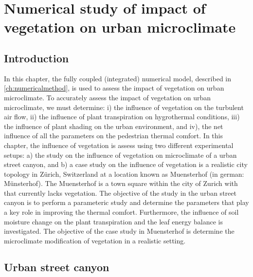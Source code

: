 \chapter{Numerical study of impact of vegetation on urban microclimate}
\label{ch:impactofvegetation}
\def\figdir{chapters/ch08_numericalstudy/figures}	
%		

\section{Introduction}

In this chapter, the fully coupled (integrated) numerical model, described in \cref{ch:numericalmethod}, is used to assess the impact of vegetation on urban microclimate. To accurately assess the impact of vegetation on urban microclimate, we must determine: i) the influence of vegetation on the turbulent air flow, ii) the influence of plant transpiration on hygrothermal conditions, iii) the influence of plant shading on the urban environment, and iv), the net influence of all the parameters on the pedestrian thermal comfort. In this chapter, the influence of vegetation is assess using two different experimental setups: a) the study on the influence of vegetation on microclimate of a urban street canyon, and b) a case study on the influence of vegetation is a realistic city topology in Z\"urich, Switzerland at a location known as Muensterhof (in german: M\"unsterhof). The Muensterhof is a town square within the city of Zurich with that currently lacks vegetation. The objective of the study in the urban street canyon is to perform a parameteric study and determine the parameters that play a key role in improving the thermal comfort.  Furthermore, the influence of soil moisture change on the plant transpiration and the leaf energy balance is investigated. The objective of the case study in Muensterhof is determine the microclimate modification of vegetation in a realistic setting.

\section{Urban street canyon}

